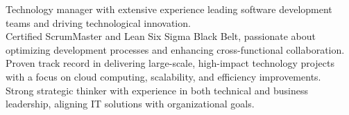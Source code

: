 
\begin{cvparagraph}
    Technology manager with extensive experience leading software development teams and driving technological innovation.
    \\Certified ScrumMaster and Lean Six Sigma Black Belt, passionate about optimizing development processes and enhancing cross-functional collaboration.
    \\Proven track record in delivering large-scale, high-impact technology projects with a focus on cloud computing, scalability, and efficiency improvements.
    \\Strong strategic thinker with experience in both technical and business leadership, aligning IT solutions with organizational goals.
\end{cvparagraph}
